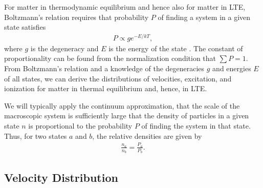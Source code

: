 For matter in thermodynamic equilibrium and hence also for matter in LTE,
Boltzmann's relation requires that
probability $P$ of finding a system in a given state satisfies
\begin{align}
P \propto g e^{-E/kT},
\end{align}
where $g$ is the degeneracy and $E$ is the energy of the state
\citep[pp.\ 201--203]{Reif-1965}. The constant of
proportionality can be found from the normalization condition that $\sum
P = 1$. From Boltzmann's relation and a knowledge of the degeneracies $g$
and energies $E$ of all states, we can derive the distributions of
velocities, excitation, and ionization for matter in thermal equilibrium
and, hence, in LTE.

We will typically apply the continuum approximation, that the scale of the macroscopic system is sufficiently large that the density of particles in a given state $n$ is proportional to the probability $P$ of finding the system in that state. Thus, for two states $a$ and $b$, the relative densities are given by
\begin{align}
\frac{n_a}{n_b} = \frac{P_a}{P_b}.
\end{align}

\newslide

\subsection{Velocity Distribution}

